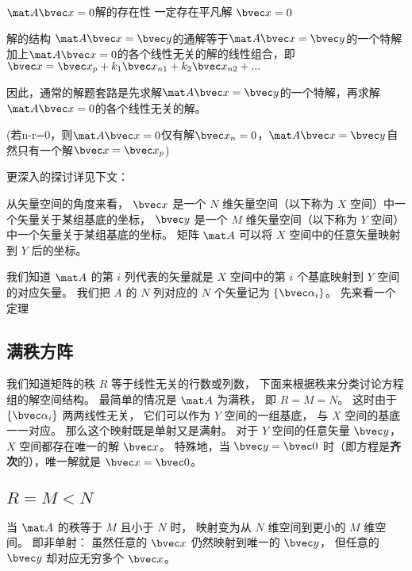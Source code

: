 \begin{theorem}{$\mat A \bvec x=0$解的存在性}
一定存在平凡解 $\bvec x=0$
\end{theorem}

\begin{theorem}{解的结构}
$\mat A \bvec x=\bvec y$的通解等于$\mat A \bvec x=\bvec y$的一个特解加上$\mat A \bvec x=0$的各个线性无关的解的线性组合，即$\bvec x = \bvec x_p +k_1\bvec x_{n1}+k_2\bvec x_{n2}+...$

因此，通常的解题套路是先求解$\mat A \bvec x=\bvec y$的一个特解，再求解$\mat A \bvec x=0$的各个线性无关的解。

(若n-r=0，则$\mat A \bvec x=0$仅有解$\bvec x_n=0$，$\mat A \bvec x=\bvec y$自然只有一个解$\bvec x = \bvec x_p$)
\end{theorem}

更深入的探讨详见下文：

从矢量空间的角度来看， $\bvec x$ 是一个 $N$ 维矢量空间（以下称为 $X$ 空间）中一个矢量关于某组基底的坐标， $\bvec y$ 是一个 $M$ 维矢量空间（以下称为 $Y$ 空间）中一个矢量关于某组基底的坐标。 矩阵 $\mat A$ 可以将 $X$ 空间中的任意矢量映射到 $Y$ 后的坐标。

我们知道 $\mat A$ 的第 $i$ 列代表的矢量就是 $X$ 空间中的第 $i$ 个基底映射到 $Y$ 空间的对应矢量。 我们把 $A$ 的 $N$ 列对应的 $N$ 个矢量记为 $\{\bvec \alpha_i\}$。 先来看一个定理

\subsection{满秩方阵}
我们知道矩阵的秩 $R$ 等于线性无关的行数或列数， 下面来根据秩来分类讨论方程组的解空间结构。 最简单的情况是 $\mat A$ 为满秩， 即 $R = M = N$。 这时由于 $\{\bvec \alpha_i\}$ 两两线性无关， 它们可以作为 $Y$ 空间的一组基底， 与 $X$ 空间的基底一一对应。 那么这个映射既是单射又是满射。%
对于 $Y$ 空间的任意矢量 $\bvec y$， $X$ 空间都存在唯一的解 $\bvec x$。 特殊地，当 $\bvec y = \bvec 0$ 时（即方程是\textbf{齐次}的），唯一解就是 $\bvec x = \bvec 0$。

\subsection{$R = M < N$}\label{sub_LinEq_1}

当 $\mat A$ 的秩等于 $M$ 且小于 $N$ 时， 映射变为从 $N$ 维空间到更小的 $M$ 维空间。 即非单射： 虽然任意的 $\bvec x$ 仍然映射到唯一的 $\bvec y$， 但任意的 $\bvec y$ 却对应无穷多个 $\bvec x$。 

